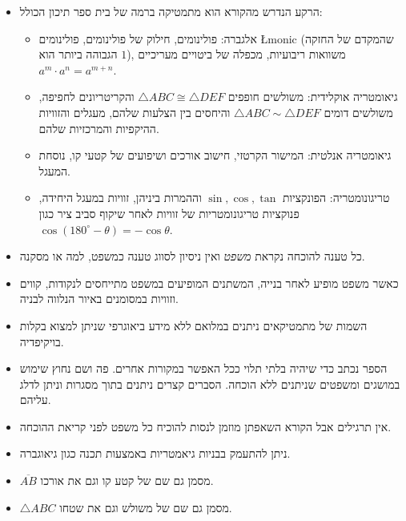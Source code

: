 \begin{itemize}
\item
הרקע הנדרש מהקורא הוא מתמטיקה ברמה של בית ספר תיכון הכולל:

\begin{itemize}
\item
אלגברה: פולינומים, חילוק של פולינומים, פולינומים 
\L{monic}
(שהמקדם של החזקה הגבוהה ביותר הוא $1$), משוואות ריבועיות, מכפלה של ביטויים מעריכיים 
$a^m\cdot a^n=a^{m+n}$.

\item
גיאומטריה אוקלידית: משולשים חופפים 
$\triangle ABC \cong \triangle DEF$
והקריטריונים לחפיפה, משולשים דומים
$\triangle ABC \sim \triangle DEF$
והיחסים בין הצלעות שלהם, מעגלים והזוויות ההיקפיות והמרכזיות שלהם.

\item
גיאומטריה אנלטית: המישור הקרטזי, חישוב אורכים ושיפועים של קטעי קו, נוסחת המעגל.

\item
טריגונומטריה: הפונקציות 
$\sin,\cos,\tan$
וההמרות ביניהן, זוויות במעגל היחידה, פנוקציות טריגונומטריות של זוויות לאחר שיקוף סביב ציר כגון
$\cos (180^\circ-\theta)=-\cos\theta$.
\end{itemize}

\item
כל טענה להוכחה נקראת 
\emph{משפט}
ואין ניסיון לסווג טענה כמשפט, למה או מסקנה.

\item
כאשר משפט מופיע לאחר בנייה, המשתנים המופיעים במשפט מתייחסים לנקודות, קווים וזוויות במסומנים באיור הנלווה לבניה.

\item
השמות של מתמטיקאים ניתנים במלואם ללא מידע ביאוגרפי שניתן למצוא בקלות בויקיפדיה.

\item
הספר נכתב כדי שיהיה בלתי תלוי ככל האפשר במקורות אחרים. פה ושם נחוץ שימוש במושגים ומשפטים שניתנים ללא הוכחה. הסברים קצרים ניתנים בתוך מסגרות וניתן לדלג עליהם.

\item
אין תרגילים אבל הקורא השאפתן מוזמן לנסות להוכיח כל משפט לפני קריאת ההוכחה.

\item
ניתן להתעמק בבניות גיאמטריות באמצעות תכנה כגון גיאוגברה.

\item
$\overline{AB}$
מסמן גם שם של קטע קו וגם את אורכו.

\item
$\triangle ABC$
מסמן גם שם של משולש וגם את שטחו.
\end{itemize}

